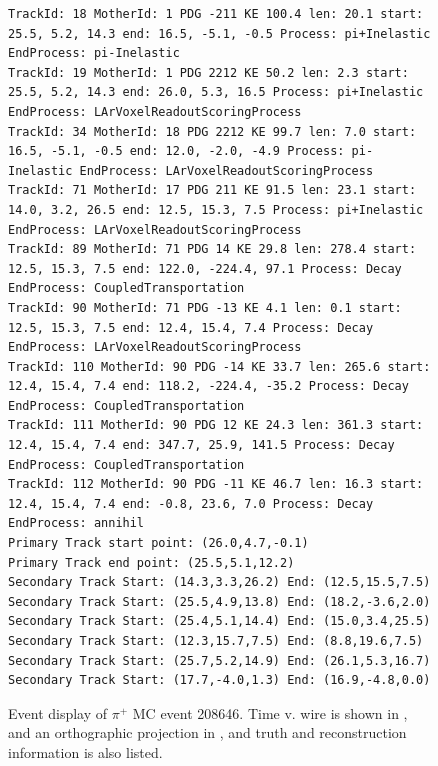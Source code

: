 \documentclass[letterpaper,12pt]{article}
\newcommand{\pip}{\ensuremath{\pi^{+}}}
\begin{document}
\begin{figure}[!hbtp]
\begin{center}
\begin{lstlisting}
TrackId: 18 MotherId: 1 PDG -211 KE 100.4 len: 20.1 start: 25.5, 5.2, 14.3 end: 16.5, -5.1, -0.5 Process: pi+Inelastic EndProcess: pi-Inelastic
TrackId: 19 MotherId: 1 PDG 2212 KE 50.2 len: 2.3 start: 25.5, 5.2, 14.3 end: 26.0, 5.3, 16.5 Process: pi+Inelastic EndProcess: LArVoxelReadoutScoringProcess
TrackId: 34 MotherId: 18 PDG 2212 KE 99.7 len: 7.0 start: 16.5, -5.1, -0.5 end: 12.0, -2.0, -4.9 Process: pi-Inelastic EndProcess: LArVoxelReadoutScoringProcess
TrackId: 71 MotherId: 17 PDG 211 KE 91.5 len: 23.1 start: 14.0, 3.2, 26.5 end: 12.5, 15.3, 7.5 Process: pi+Inelastic EndProcess: LArVoxelReadoutScoringProcess
TrackId: 89 MotherId: 71 PDG 14 KE 29.8 len: 278.4 start: 12.5, 15.3, 7.5 end: 122.0, -224.4, 97.1 Process: Decay EndProcess: CoupledTransportation
TrackId: 90 MotherId: 71 PDG -13 KE 4.1 len: 0.1 start: 12.5, 15.3, 7.5 end: 12.4, 15.4, 7.4 Process: Decay EndProcess: LArVoxelReadoutScoringProcess
TrackId: 110 MotherId: 90 PDG -14 KE 33.7 len: 265.6 start: 12.4, 15.4, 7.4 end: 118.2, -224.4, -35.2 Process: Decay EndProcess: CoupledTransportation
TrackId: 111 MotherId: 90 PDG 12 KE 24.3 len: 361.3 start: 12.4, 15.4, 7.4 end: 347.7, 25.9, 141.5 Process: Decay EndProcess: CoupledTransportation
TrackId: 112 MotherId: 90 PDG -11 KE 46.7 len: 16.3 start: 12.4, 15.4, 7.4 end: -0.8, 23.6, 7.0 Process: Decay EndProcess: annihil
Primary Track start point: (26.0,4.7,-0.1)
Primary Track end point: (25.5,5.1,12.2)
Secondary Track Start: (14.3,3.3,26.2) End: (12.5,15.5,7.5)
Secondary Track Start: (25.5,4.9,13.8) End: (18.2,-3.6,2.0)
Secondary Track Start: (25.4,5.1,14.4) End: (15.0,3.4,25.5)
Secondary Track Start: (12.3,15.7,7.5) End: (8.8,19.6,7.5)
Secondary Track Start: (25.7,5.2,14.9) End: (26.1,5.3,16.7)
Secondary Track Start: (17.7,-4.0,1.3) End: (16.9,-4.8,0.0)
\end{lstlisting}
    \caption{%
                Event display of \pip{} MC event 208646. 
                Time v. wire is shown in , 
                and an orthographic projection in ,
                and truth and reconstruction information is also listed.
            }
    \label{fig:evd_pipMC_208646}
  \end{center}
\end{figure}
\end{document}
